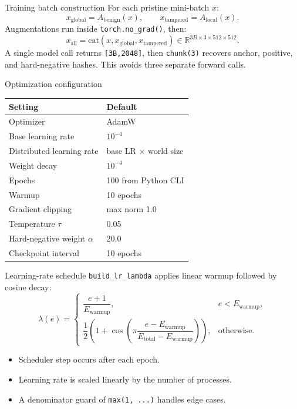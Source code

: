 \documentclass[aspectratio=169,10pt]{beamer}
\newcommand{\shape}[1]{\texttt{#1}}
\newcommand{\code}[1]{\texttt{#1}}
\begin{document}
\begin{frame}{Training batch construction}
  For each pristine mini-batch $x$:
  \[
    x_{\mathrm{global}} = A_{\mathrm{benign}}(x), \qquad
    x_{\mathrm{tampered}} = A_{\mathrm{local}}(x).
  \]
  Augmentations run inside \code{torch.no\_grad()}, then:
  \[
    x_{\mathrm{all}} =
    \mathrm{cat}(x,x_{\mathrm{global}},x_{\mathrm{tampered}})
    \in \mathbb{R}^{3B\times3\times512\times512}.
  \]
  A single model call returns \shape{[3B,2048]}, then \code{chunk(3)} recovers
  anchor, positive, and hard-negative hashes. This avoids three separate forward calls.
\end{frame}

\begin{frame}{Optimization configuration}
  \centering
  \begin{tabular}{ll}
    \toprule
    Setting & Default\\
    \midrule
    Optimizer & AdamW\\
    Base learning rate & $10^{-4}$\\
    Distributed learning rate & base LR $\times$ world size\\
    Weight decay & $10^{-4}$\\
    Epochs & 100 from Python CLI\\
    Warmup & 10 epochs\\
    Gradient clipping & max norm 1.0\\
    Temperature $\tau$ & 0.05\\
    Hard-negative weight $\alpha$ & 20.0\\
    Checkpoint interval & 10 epochs\\
    \bottomrule
  \end{tabular}
\end{frame}

\begin{frame}{Learning-rate schedule}
  \code{build\_lr\_lambda} applies linear warmup followed by cosine decay:
  \[
    \lambda(e)=
    \begin{cases}
      \dfrac{e+1}{E_{\mathrm{warmup}}}, & e < E_{\mathrm{warmup}},\\[0.8em]
      \dfrac{1}{2}\left(1+\cos\left(\pi
      \dfrac{e-E_{\mathrm{warmup}}}{E_{\mathrm{total}}-E_{\mathrm{warmup}}}
      \right)\right), & \text{otherwise.}
    \end{cases}
  \]
  \begin{itemize}
    \item Scheduler step occurs after each epoch.
    \item Learning rate is scaled linearly by the number of processes.
    \item A denominator guard of \code{max(1, ...)} handles edge cases.
  \end{itemize}
\end{frame}
\end{document}

